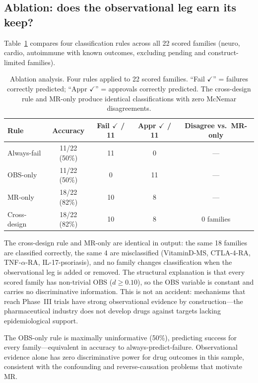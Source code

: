 \documentclass[11pt]{article}
\begin{document}
\subsection{Ablation: does the observational leg earn its keep?}
\label{sec:ablation}

Table~\ref{tab:ablation} compares four classification rules across all 22 scored families (neuro, cardio, autoimmune with known outcomes, excluding pending and construct-limited families).

\begin{table}[t]
\centering
\caption{Ablation analysis. Four rules applied to 22 scored families. ``Fail $\checkmark$'' = failures correctly predicted; ``Appr $\checkmark$'' = approvals correctly predicted. The cross-design rule and MR-only produce identical classifications with zero McNemar disagreements.}
\label{tab:ablation}
\begin{tabular}{lcccc}
\toprule
Rule & Accuracy & Fail $\checkmark$ / 11 & Appr $\checkmark$ / 11 & Disagree vs.\ MR-only \\
\midrule
Always-fail & 11/22 (50\%) & 11 & 0 & --- \\
OBS-only & 11/22 (50\%) & 0 & 11 & --- \\
MR-only & 18/22 (82\%) & 10 & 8 & --- \\
Cross-design & 18/22 (82\%) & 10 & 8 & 0 families \\
\bottomrule
\end{tabular}
\end{table}

The cross-design rule and MR-only are identical in output: the same 18 families are classified correctly, the same 4 are misclassified (VitaminD-MS, CTLA-4-RA, TNF-$\alpha$-RA, IL-17-psoriasis), and no family changes classification when the observational leg is added or removed. The structural explanation is that every scored family has non-trivial OBS ($d \geq 0.10$), so the OBS variable is constant and carries no discriminative information. This is not an accident: mechanisms that reach Phase~III trials have strong observational evidence by construction---the pharmaceutical industry does not develop drugs against targets lacking epidemiological support.

The OBS-only rule is maximally uninformative (50\%), predicting success for every family---equivalent in accuracy to always-predict-failure. Observational evidence alone has zero discriminative power for drug outcomes in this sample, consistent with the confounding and reverse-causation problems that motivate MR.
\end{document}
